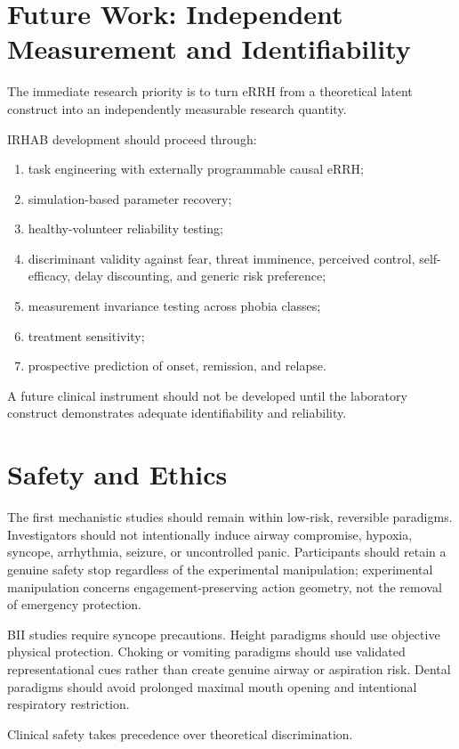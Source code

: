 \documentclass[11pt]{article}
\begin{document}
\section{Future Work: Independent Measurement and Identifiability}
The immediate research priority is to turn eRRH from a theoretical latent construct into an independently measurable research quantity.

IRHAB development should proceed through:
\begin{enumerate}[leftmargin=2em]
\item task engineering with externally programmable causal eRRH;
\item simulation-based parameter recovery;
\item healthy-volunteer reliability testing;
\item discriminant validity against fear, threat imminence, perceived control, self-efficacy, delay discounting, and generic risk preference;
\item measurement invariance testing across phobia classes;
\item treatment sensitivity;
\item prospective prediction of onset, remission, and relapse.
\end{enumerate}

A future clinical instrument should not be developed until the laboratory construct demonstrates adequate identifiability and reliability.

\section{Safety and Ethics}
The first mechanistic studies should remain within low-risk, reversible paradigms. Investigators should not intentionally induce airway compromise, hypoxia, syncope, arrhythmia, seizure, or uncontrolled panic. Participants should retain a genuine safety stop regardless of the experimental manipulation; experimental manipulation concerns engagement-preserving action geometry, not the removal of emergency protection.

BII studies require syncope precautions. Height paradigms should use objective physical protection. Choking or vomiting paradigms should use validated representational cues rather than create genuine airway or aspiration risk. Dental paradigms should avoid prolonged maximal mouth opening and intentional respiratory restriction.

Clinical safety takes precedence over theoretical discrimination.
\end{document}
